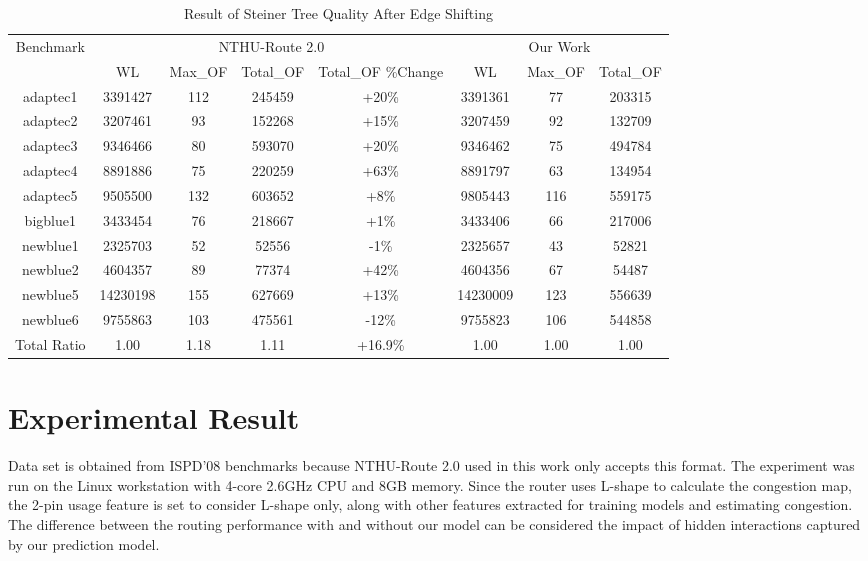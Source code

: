 \begin{table*}[htbp]
    \centering
    \caption{Result of Steiner Tree Quality After Edge Shifting}
    \label{tab:treequality}
    \begin{tabular}{c|c|c|c|c|c|c|c}
\toprule
\multirow{2}{*}{Benchmark} & \multicolumn{4}{c|}{NTHU-Route 2.0 \cite{NTHU}}           & \multicolumn{3}{c}{Our Work}  \\ \cline{2-8} 
                           & WL       & Max\_OF & Total\_OF & Total\_OF \%Change & WL       & Max\_OF & Total\_OF \\ \hline
adaptec1                   & 3391427  & 112     & 245459    & +20\%              & 3391361  & 77      & 203315    \\ \hline
adaptec2                   & 3207461  & 93      & 152268    & +15\%              & 3207459  & 92      & 132709    \\ \hline
adaptec3                   & 9346466  & 80      & 593070    & +20\%              & 9346462  & 75      & 494784    \\ \hline
adaptec4                   & 8891886  & 75      & 220259    & +63\%              & 8891797  & 63      & 134954    \\ \hline
adaptec5                   & 9505500  & 132     & 603652    & +8\%               & 9805443  & 116     & 559175    \\ \hline
bigblue1                   & 3433454  & 76      & 218667    & +1\%               & 3433406  & 66      & 217006    \\ \hline
newblue1                   & 2325703  & 52      & 52556     & -1\%               & 2325657  & 43      & 52821     \\ \hline
newblue2                   & 4604357  & 89      & 77374     & +42\%              & 4604356  & 67      & 54487     \\ \hline
newblue5                   & 14230198 & 155     & 627669    & +13\%              & 14230009 & 123     & 556639    \\ \hline
newblue6                   & 9755863  & 103     & 475561    & -12\%              & 9755823  & 106     & 544858    \\ \hline
Total Ratio                & 1.00     & 1.18    & 1.11      & +16.9\%            & 1.00     & 1.00    & 1.00      \\ \bottomrule
\end{tabular}
\end{table*}

\section{Experimental Result}
\label{sec:result}
Data set is obtained from ISPD'08 benchmarks because NTHU-Route 2.0 \cite{NTHU} used in this work only accepts this format. The experiment was run on the Linux workstation with 4-core 2.6GHz CPU and 8GB memory. Since the router uses L-shape to calculate the congestion map, the 2-pin usage feature is set to consider L-shape only, along with other features  extracted for training models and estimating congestion. The difference between the routing performance with and without our model can be considered the impact of hidden interactions captured by our prediction model.

